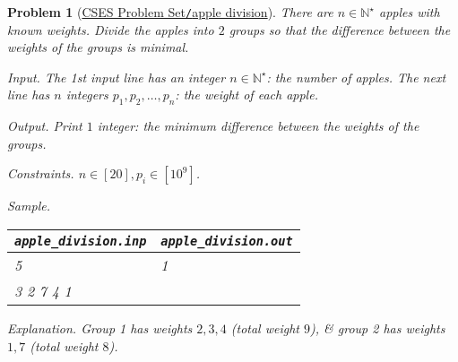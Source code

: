 \documentclass{article}
\newtheorem{problem}{Problem}
\begin{document}
\begin{problem}[\href{https://cses.fi/problemset/task/1623}{CSES Problem Set{\tt/}apple division}]
    There are $n\in\mathbb{N}^\star$ apples with known weights. Divide the apples into $2$ groups so that the difference between the weights of the groups is minimal.
    \item {\sf Input.} The 1st input line has an integer $n\in\mathbb{N}^\star$: the number of apples. The next line has $n$ integers $p_1,p_2,\ldots,p_n$: the weight of each apple.
    \item {\sf Output.} Print $1$ integer: the minimum difference between the weights of the groups.
    \item {\sf Constraints.} $n\in[20],p_i\in[10^9]$.
    \item {\sf Sample.}
    \begin{table}[H]
        \centering
        \begin{tabular}{|l|l|}
            \hline
            \verb|apple_division.inp| & \verb|apple_division.out| \\
            \hline
            5 & 1 \\
            3 2 7 4 1 & \\
            \hline
        \end{tabular}
    \end{table}
    \item {\sf Explanation.} Group 1 has weights $2,3,4$ (total weight $9$), \& group 2 has weights $1,7$ (total weight $8$).
\end{problem}
\end{document}
